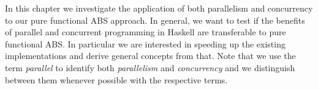 In this chapter we investigate the application of both parallelism and concurrency to our pure functional ABS approach. In general, we want to test if the benefits of parallel and concurrent programming in Haskell are transferable to pure functional ABS. In particular we are interested in speeding up the existing implementations and derive general concepts from that. Note that we use the term \textit{parallel} to identify both \textit{parallelism} and \textit{concurrency} and we distinguish between them whenever possible with the respective terms.





